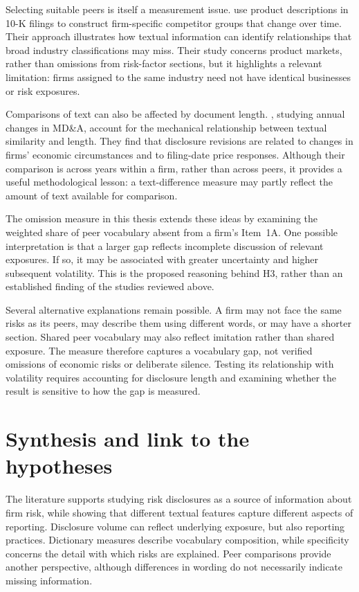 Selecting suitable peers is itself a measurement issue. \textcite{hoberg2016}
use product descriptions in 10-K filings to construct firm-specific competitor
groups that change over time. Their approach illustrates how textual
information can identify relationships that broad industry classifications may
miss. Their study concerns product markets, rather than omissions from
risk-factor sections, but it highlights a relevant limitation: firms assigned
to the same industry need not have identical businesses or risk exposures.

Comparisons of text can also be affected by document length. \textcite{brown2011},
studying annual changes in MD\&A, account for the mechanical relationship
between textual similarity and length. They find that disclosure revisions are
related to changes in firms' economic circumstances and to filing-date price
responses. Although their comparison is across years within a firm, rather than
across peers, it provides a useful methodological lesson: a text-difference
measure may partly reflect the amount of text available for comparison.

The omission measure in this thesis extends these ideas by examining the
weighted share of peer vocabulary absent from a firm's Item~1A. One possible
interpretation is that a larger gap reflects incomplete discussion of relevant
exposures. If so, it may be associated with greater uncertainty and higher
subsequent volatility. This is the proposed reasoning behind H3, rather than
an established finding of the studies reviewed above.

Several alternative explanations remain possible. A firm may not face the same
risks as its peers, may describe them using different words, or may have a
shorter section. Shared peer vocabulary may also reflect imitation rather than
shared exposure. The measure therefore captures a vocabulary gap, not verified
omissions of economic risks or deliberate silence. Testing its relationship
with volatility requires accounting for disclosure length and examining whether
the result is sensitive to how the gap is measured.

\section{Synthesis and link to the hypotheses}

The literature supports studying risk disclosures as a source of information
about firm risk, while showing that different textual features capture
different aspects of reporting. Disclosure volume can reflect underlying
exposure, but also reporting practices. Dictionary measures describe vocabulary
composition, while specificity concerns the detail with which risks are
explained. Peer comparisons provide another perspective, although differences
in wording do not necessarily indicate missing information.

